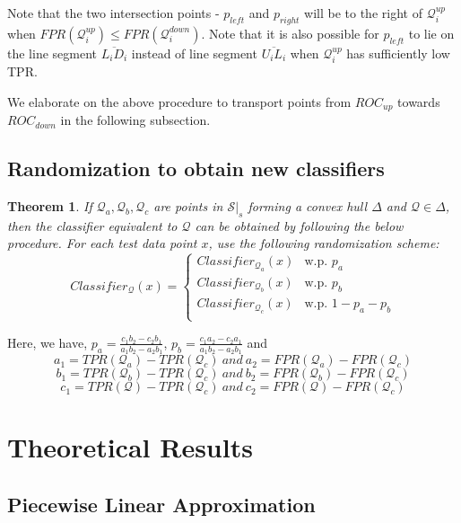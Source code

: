 \documentclass{article}
\newtheorem{theorem}{Theorem}[section]
\begin{document}
Note that the two intersection points - $p_{left}$ and $p_{right}$ will be to the right of $\mathcal{Q}_{i}^{up}$ when $FPR(\mathcal{Q}_{i}^{up}) \le FPR(\mathcal{Q}_{i}^{down})$. Note that it is also possible for $p_{left}$ to lie on the line segment $\overline{L_i D_i}$ instead of line segment $\overline{U_i L_i}$ when $\mathcal{Q}_i^{up}$ has sufficiently low TPR.

We elaborate on the above procedure to transport points from $ROC_{up}$ towards $ROC_{down}$ in the following subsection.

\subsection{Randomization to obtain new classifiers}
\begin{theorem}
    If $\mathcal{Q}_a,\mathcal{Q}_b,\mathcal{Q}_c$ are points in $\mathcal{S}|_s$ forming a convex hull $\Delta$ and $\mathcal{Q} \in \Delta$, then the classifier equivalent to $\mathcal{Q}$ can be obtained by following the below procedure. For each test data point $x$, use the following randomization scheme:
\begin{equation}
    Classifier_{\mathcal{Q}}(x)=
    \begin{cases}
        Classifier_{\mathcal{Q}_a}(x) & \text{w.p. } p_a \\
        Classifier_{\mathcal{Q}_b}(x) & \text{w.p. } p_b \\
        Classifier_{\mathcal{Q}_c}(x) & \text{w.p. } 1-p_a-p_b \\
    \end{cases}
\end{equation}
\end{theorem}
Here, we have, 
$p_a = \frac{c_1b_2 - c_2b_1}{a_1b_2 - a_2b_1}$, $p_b = \frac{c_1a_2 - c_2a_1}{a_1b_2 - a_2b_1}$ and 
\[a_1 = TPR(\mathcal{Q}_a) - TPR(\mathcal{Q}_c)~and~a_2 = FPR(\mathcal{Q}_a) - FPR(\mathcal{Q}_c)\] 
\[b_1 = TPR(\mathcal{Q}_b) - TPR(\mathcal{Q}_c)~and~b_2 = FPR(\mathcal{Q}_b) - FPR(\mathcal{Q}_c)\] 
\[c_1 = TPR(\mathcal{Q}) - TPR(\mathcal{Q}_c)~and~c_2 = FPR(\mathcal{Q}) - FPR(\mathcal{Q}_c)\]



\section{Theoretical Results}
\subsection{Piecewise Linear Approximation}
\end{document}
